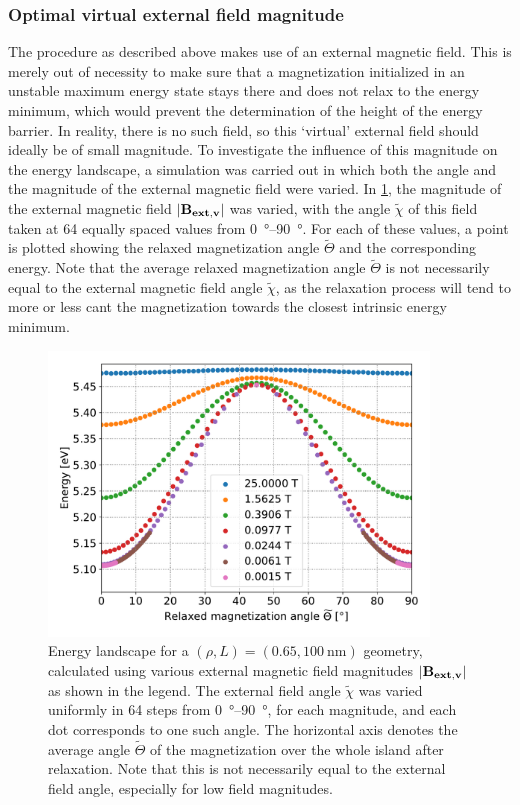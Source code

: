 \documentclass[11pt,a4paper,english]{article}
\begin{document}
\subsubsection{Optimal virtual external field magnitude}
The procedure as described above makes use of an external magnetic field. This is merely out of necessity to make sure that a magnetization initialized in an unstable maximum energy state stays there and does not relax to the energy minimum, which would prevent the determination of the height of the energy barrier. In reality, there is no such field, so this `virtual' external field should ideally be of small magnitude. To investigate the influence of this magnitude on the energy landscape, a simulation was carried out in which both the angle and the magnitude of the external magnetic field were varied. In \cref{fig:barrierLandscape-sweepBext_r0.65}, the magnitude of the external magnetic field $\abs{\vb{B_{ext,v}}}$ was varied, with the angle $\widetilde{\chi}$ of this field taken at 64 equally spaced values from \SIrange{0}{90}{\degree}. For each of these values, a point is plotted showing the relaxed magnetization angle $\widetilde{\Theta}$ and the corresponding energy. Note that the average relaxed magnetization angle $\widetilde{\Theta}$ is not necessarily equal to the external magnetic field angle $\widetilde{\chi}$, as the relaxation process will tend to more or less cant the magnetization towards the closest intrinsic energy minimum. \par
\begin{figure}
    \centering
    \includegraphics[width=0.9\textwidth]{Figures/biaxial_island/BarrierLandscape/Plus_65_B25-0.001-div4_a128Pi_plotOptimized.pdf}
    \caption{Energy landscape for a $(\rho, L)=(0.65, \SI{100}{\nano\metre})$ geometry, calculated using various external magnetic field magnitudes $\abs{\vb{B_{ext,v}}}$ as shown in the legend. The external field angle $\widetilde{\chi}$ was varied uniformly in 64 steps from \SIrange{0}{90}{\degree}, for each magnitude, and each dot corresponds to one such angle. The horizontal axis denotes the average angle $\widetilde{\Theta}$ of the magnetization over the whole island after relaxation. Note that this is not necessarily equal to the external field angle, especially for low field magnitudes.}
    \label{fig:barrierLandscape-sweepBext_r0.65}
\end{figure}
\end{document}
